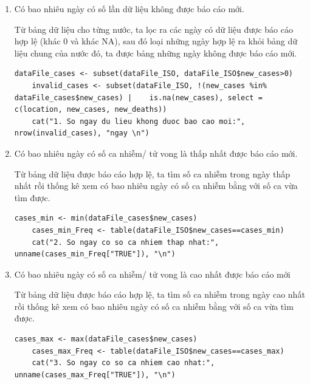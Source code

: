 \documentclass[a4paper]{article}
\theoremstyle{definition}
\begin{document}
\begin{enumerate}[1)]
    \item Có bao nhiêu ngày có số lần dữ liệu không được báo cáo mới.
    
    Từ bảng dữ liệu cho từng nước, ta lọc ra các ngày có dữ liệu được báo cáo hợp lệ (khác 0 và khác NA), sau đó loại những ngày hợp lệ ra khỏi bảng dữ liệu chung của nước đó, ta được bảng những ngày không được báo cáo mới.
    
    \begin{lstlisting}[gobble=4]
    dataFile_cases <- subset(dataFile_ISO, dataFile_ISO$new_cases>0)
    invalid_cases <- subset(dataFile_ISO, !(new_cases %in% dataFile_cases$new_cases) |    is.na(new_cases), select = c(location, new_cases, new_deaths))
    cat("1. So ngay du lieu khong duoc bao cao moi:", nrow(invalid_cases), "ngay \n")
    \end{lstlisting}
    
    \item Có bao nhiêu ngày có số ca nhiễm/ tử vong là thấp nhất được báo cáo mới.
    
    Từ bảng dữ liệu được báo cáo hợp lệ, ta  tìm số ca nhiễm trong ngày thấp nhất rồi thống kê xem có bao nhiêu ngày có số ca nhiễm bằng với số ca vừa tìm được.
    
    \begin{lstlisting}[gobble=4]
    cases_min <- min(dataFile_cases$new_cases)
    cases_min_Freq <- table(dataFile_ISO$new_cases==cases_min)
    cat("2. So ngay co so ca nhiem thap nhat:", unname(cases_min_Freq["TRUE"]), "\n")
    \end{lstlisting}
    
    \item Có bao nhiêu ngày có số ca nhiễm/ tử vong là cao nhất được báo cáo mới
    
    Từ bảng dữ liệu được báo cáo hợp lệ, ta  tìm số ca nhiễm trong ngày cao nhất rồi thống kê xem có bao nhiêu ngày có số ca nhiễm bằng với số ca vừa tìm được.
    
    \begin{lstlisting}[gobble=4]
    cases_max <- max(dataFile_cases$new_cases)
    cases_max_Freq <- table(dataFile_ISO$new_cases==cases_max)
    cat("3. So ngay co so ca nhiem cao nhat:", unname(cases_max_Freq["TRUE"]), "\n")
    \end{lstlisting}
    

\end{enumerate}
\end{document}
